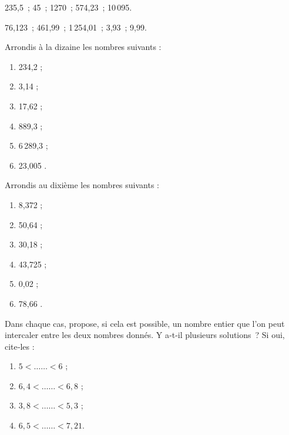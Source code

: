 


\begin{exercice}
235,5 ; 45 ; 1270 ; 574,23 ; 10\,095.
\end{exercice}


\begin{exercice}
76,123 ; 461,99 ; 1\,254,01 ; 3,93 ; 9,99.
\end{exercice}


\begin{exercice}
Arrondis à la dizaine les nombres suivants :
\begin{enumerate}
 \item 234,2 \dotfill ; 
 
 \item 3,14 \dotfill ; 
 
 \item 17,62 \dotfill ; 
 
 \item 889,3 \dotfill ; 
 
 \item 6\,289,3 \dotfill ; 
 
 \item 23,005 \dotfill. 
 
 \end{enumerate}
\end{exercice}


\begin{exercice}
Arrondis au dixième les nombres suivants :
\begin{enumerate}
 \item 8,372 \dotfill ; 
 
 \item 50,64 \dotfill ; 
 
 \item 30,18 \dotfill ; 
 
 \item 43,725 \dotfill ; 
 
 \item 0,02 \dotfill ; 
 
 \item 78,66 \dotfill. 
 
 \end{enumerate}
\end{exercice}


\begin{exercice}
Dans chaque cas, propose, si cela est possible, un nombre entier que l'on peut intercaler entre les deux nombres donnés. 
Y a‑t‑il plusieurs solutions ? Si oui, cite‑les :
\begin{enumerate}
 \item $5 < …… < 6$ ;
 \item $6,4 < …… < 6,8$ ;
 \item $3,8 < …… < 5,3$ ;
 \item $6,5 < …… < 7,21$.
 \end{enumerate}
\end{exercice}


